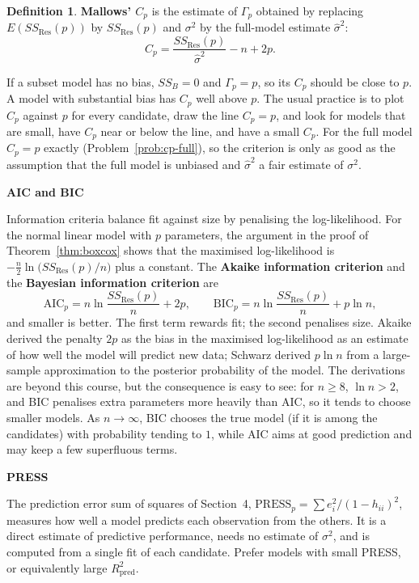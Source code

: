 \documentclass[11pt,a4paper]{article}
\numberwithin{equation}{section}
\theoremstyle{definition}
\newtheorem{defn}[thm]{Definition}
\newcommand{\subhead}[1]{%
  \par\medskip\noindent\textbf{#1}\par\nobreak\smallskip}
\begin{document}
\begin{defn}
\textbf{Mallows' $C_p$} is the estimate of $\Gamma_p$ obtained by replacing $E(SS_{\mathrm{Res}}(p))$ by
$SS_{\mathrm{Res}}(p)$ and $\sigma^2$ by the full-model estimate $\hat\sigma^2$:
\[
C_p = \frac{SS_{\mathrm{Res}}(p)}{\hat\sigma^2} - n + 2p .
\]
\end{defn}

If a subset model has no bias, $SS_B = 0$ and $\Gamma_p = p$, so its $C_p$ should be close to $p$. A
model with substantial bias has $C_p$ well above $p$. The usual practice is to plot $C_p$ against
$p$ for every candidate, draw the line $C_p = p$, and look for models that are small, have $C_p$
near or below the line, and have a small $C_p$. For the full model $C_p = p$ exactly
(Problem~\ref{prob:cp-full}), so the criterion is only as good as the assumption that the full
model is unbiased and $\hat\sigma^2$ a fair estimate of $\sigma^2$.

\subhead{AIC and BIC}
Information criteria balance fit against size by penalising the log-likelihood. For the normal
linear model with $p$ parameters, the argument in the proof of Theorem~\ref{thm:boxcox} shows
that the maximised log-likelihood is $-\frac{n}{2}\ln\bigl(SS_{\mathrm{Res}}(p)/n\bigr)$ plus a
constant. The
\textbf{Akaike information criterion} and the \textbf{Bayesian information criterion} are
\[
\mathrm{AIC}_p = n\ln\frac{SS_{\mathrm{Res}}(p)}{n} + 2p ,
\qquad
\mathrm{BIC}_p = n\ln\frac{SS_{\mathrm{Res}}(p)}{n} + p\ln n ,
\]
and smaller is better. The first term rewards fit; the second penalises size. Akaike derived the
penalty $2p$ as the bias in the maximised log-likelihood as an estimate of how well the model will
predict new data; Schwarz derived $p\ln n$ from a large-sample approximation to the posterior
probability of the model. The derivations are beyond this course, but the consequence is easy to
see: for $n \ge 8$, $\ln n > 2$, and BIC penalises extra parameters more heavily than AIC, so it
tends to choose smaller models. As $n \to \infty$, BIC chooses the true model (if it is among the
candidates) with probability tending to $1$, while AIC aims at good prediction and may keep a few
superfluous terms.

\subhead{PRESS}
The prediction error sum of squares of Section~4,
$\mathrm{PRESS}_p = \sum e_i^2/(1 - h_{ii})^2$, measures how well a model predicts each observation
from the others. It is a direct estimate of predictive performance, needs no estimate of
$\sigma^2$, and is computed from a single fit of each candidate. Prefer models with small PRESS, or
equivalently large $R^2_{\mathrm{pred}}$.
\end{document}
